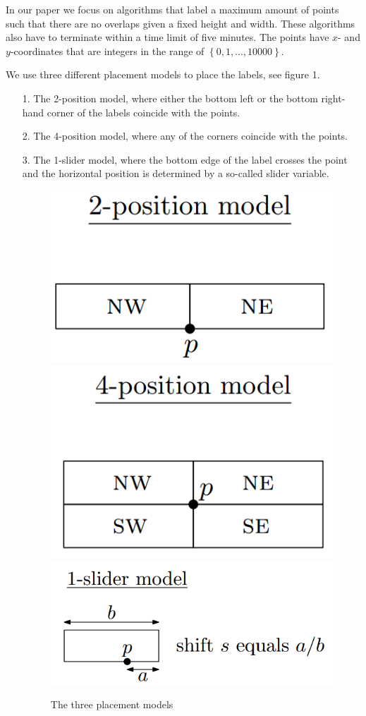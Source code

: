 \documentclass[crop=false,a4paper,oneside,11pt]{standalone}
\begin{document}
 In our paper we focus on algorithms that label a maximum amount of points such that there are no overlaps given a fixed height and width. These algorithms also have to terminate within a time limit of five minutes. The points have $x$- and $y$-coordinates that are integers in the range of $\left\{0,1,...,10000\right\}$.

 We use three different placement models to place the labels, see figure 1.
 \begin{enumerate}
 \item[1.] The 2-position model, where either the bottom left or the bottom right-hand corner of the labels coincide with the points.
 \item[2.] The 4-position model, where any of the corners coincide with the points.
 \item[3.] The 1-slider model, where the bottom edge of the label crosses the point and the horizontal position is determined by a so-called slider variable.
 \begin{figure}[h!]
 \includegraphics[scale = 0.5]{2pos.png} \includegraphics[scale = 0.5]{4pos.png} \includegraphics[scale = 0.5]{1slider.png}\\
 \caption{The three placement models}
 \end{figure}
 \end{enumerate}
\end{document}
